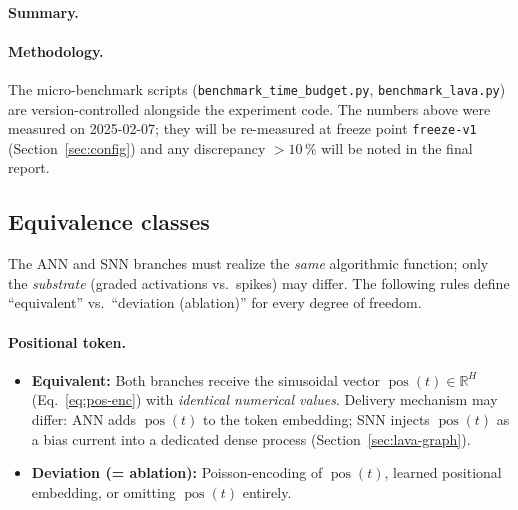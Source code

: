 \documentclass[11pt,a4paper]{article}
\newcommand{\pos}{\operatorname{pos}}      %
\begin{document}
\paragraph{Summary.}
\begin{center}
\end{center}

\paragraph{Methodology.}
The micro-benchmark scripts (\texttt{benchmark\_time\_budget.py},
\texttt{benchmark\_lava.py}) are version-controlled alongside the
experiment code.  The numbers above were measured on 2025-02-07; they
will be re-measured at freeze point \texttt{freeze-v1}
(Section~\ref{sec:config}) and any discrepancy $> 10$\,\% will be
noted in the final report.

\subsection{Equivalence classes}\label{sec:equivalence}

The ANN and SNN branches must realize the \emph{same} algorithmic
function; only the \emph{substrate} (graded activations vs.\ spikes) may
differ.  The following rules define ``equivalent'' vs.\ ``deviation
(ablation)'' for every degree of freedom.

\paragraph{Positional token.}
\begin{itemize}[nosep]
\item \textbf{Equivalent:} Both branches receive the sinusoidal vector
  $\pos(t) \in \mathbb{R}^H$ (Eq.~\ref{eq:pos-enc}) with
  \emph{identical numerical values}.  Delivery mechanism may differ:
  ANN adds $\pos(t)$ to the token embedding; SNN injects $\pos(t)$ as a
  bias current into a dedicated dense process (Section~\ref{sec:lava-graph}).
\item \textbf{Deviation (= ablation):} Poisson-encoding of $\pos(t)$,
  learned positional embedding, or omitting $\pos(t)$ entirely.
\end{itemize}
\end{document}

